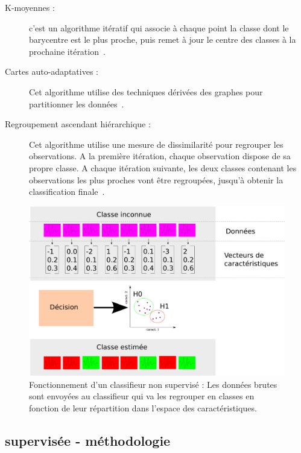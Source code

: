 \begin{description}
 \item[K-moyennes : ] c'est un algorithme itératif qui associe à chaque point la classe dont le barycentre est le plus proche, puis remet à jour le centre des classes à la prochaine itération~\cite{herwig1999large}.
 \item[Cartes auto-adaptatives : ] Cet algorithme utilise des techniques dérivées des graphes pour partitionner les données~\cite{kohonen1982self}.
 \item[Regroupement ascendant hiérarchique : ] Cet algorithme utilise une mesure de dissimilarité pour regrouper les observations. A la première itération, chaque observation dispose de sa propre classe. A chaque itération suivante, les deux classes contenant les observations les plus proches vont être regroupées, jusqu'à obtenir la classification finale~\cite{ward1963hierarchical}.
\end{description}


\begin{figure}[h]
	\begin{center}
	\includegraphics[width=15cm]{images/fonctionnementClassifNonSup}
	\end{center}
	\caption{Fonctionnement d'un classifieur non supervisé : Les données brutes sont envoyées au classifieur qui va les regrouper en classes en fonction de leur répartition dans l'espace des caractéristiques.}
	\label{fig:fonctionnementClassifNonSup}
\end{figure}


		\subsection{supervisée - méthodologie}

